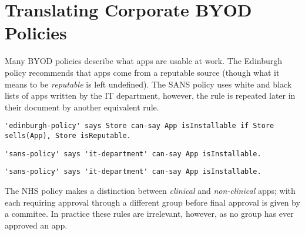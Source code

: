 \documentclass{easychair}
\begin{document}
\section{Translating Corporate BYOD Policies}
\label{sec:translation}

Many BYOD policies describe what apps are usable at work.
The Edinburgh policy recommends that apps come from a reputable source (though what it means to be \emph{reputable} is left undefined). 
The SANS policy uses white and black lists of apps written by the IT department, however, the rule is repeated later in their document by another equivalent rule.
\begin{lstlisting}[title={\footnotesize\textbf{Edinburgh}:~\itshape ``Only download applications (‘apps’) or other software from reputable sources.''}]
'edinburgh-policy' says Store can-say App isInstallable if Store sells(App), Store isReputable.
\end{lstlisting}
\begin{lstlisting}[title={\footnotesize\textbf{SANS}:~\itshape ``The IT Department maintains a list of allowed and unauthorzed applications and makes them available to users on the intranet.''}]
'sans-policy' says 'it-department' can-say App isInstallable.
\end{lstlisting}
\begin{lstlisting}[title={\footnotesize\textbf{SANS}:~\itshape ``Only approved third party applications can be
installed on handhelds. The approved list can be
obtained by contacting the IT department, or should be
available on the intranet.''}]
'sans-policy' says 'it-department' can-say App isInstallable.
\end{lstlisting}
The NHS policy makes a distinction between \emph{clinical} and \emph{non-clinical} apps;
    with each requiring approval through a different group before final approval is given by a commitee.
In practice these rules are irrelevant, however, as no group has ever approved an app.
\end{document}
